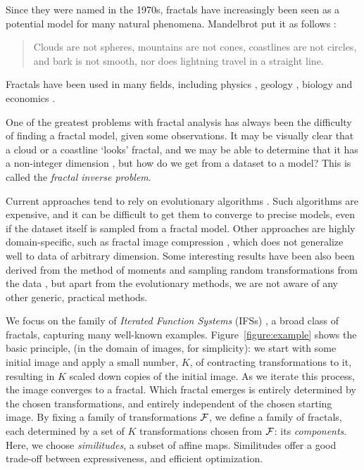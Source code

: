 \documentclass[reprint,amsmath,amssymb,aps,prl]{revtex4-1}
\begin{document}
Since they were named in the 1970s, fractals have increasingly been seen as a potential model for many natural phenomena. Mandelbrot put it as follows \cite{mandelbrot1982fractal}: 
\begin{quote}
\noindent Clouds are not spheres, mountains are not cones, coastlines are not circles, and bark is not smooth, nor does lightning travel in a straight line.
\end{quote}
Fractals have been used in many fields, including physics \cite{mandelbrot1984fractals}, geology \cite{cheng1997multifractal}, biology \cite{goldberger1992fractal} and economics \cite{turiel2003multifractal}.

One of the greatest problems with fractal analysis has always been the difficulty of finding a fractal model, given some observations. It may be visually clear that a cloud or a coastline `looks' fractal, and we may be able to determine that it has a non-integer dimension \cite{theiler1990estimating}, but how do we get from a dataset to a model? This is called the \emph{fractal inverse problem}.

Current approaches tend to rely on evolutionary algorithms \cite{deliu1991genetic,collet2000polar,nettleton1994evolutionary}. Such algorithms are expensive, and it can be difficult to get them to converge to precise models, even if the dataset itself is sampled from a fractal model. Other approaches are highly domain-specific, such as fractal image compression \cite{hart1996fractal}, which does not generalize well to data of arbitrary dimension. Some interesting results have been also been derived from the method of moments \cite{rinaldo1994inverse} and sampling random transformations from the data \cite{hart1997similarity}, but apart from the evolutionary methods, we are not aware of any other generic, practical methods. 

We focus on the family of \emph{Iterated Function Systems} (IFSs) \cite{barnsley2014fractals,hutchinson2000deterministic}, a broad class of fractals, capturing many well-known examples. Figure~\ref{figure:example} shows the basic principle, (in the domain of images, for simplicity): we start with some initial image and apply a small number, $K$, of contracting transformations to it, resulting in $K$ scaled down copies of the initial image. As we iterate this process, the image converges to a fractal. Which fractal emerges is entirely determined by the chosen transformations, and entirely independent of the chosen starting image. By fixing a family of transformations $\cal F$, we define a family of fractals, each determined by a set of $K$ transformations chosen from $\cal F$: its \emph{components}. Here, we choose \emph{similitudes}, a subset of affine maps. Similitudes offer a good trade-off between expressiveness, and efficient optimization. 
\end{document}
